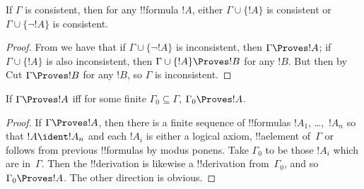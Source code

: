 \documentclass[../../include/open-logic-section]{subfiles}
\begin{document}
\begin{prop}
If $\Gamma$ is consistent, then for any !!{formula} $!A$, either
$\Gamma \cup\{!A\}$ is consistent or $\Gamma \cup\{\lnot !A\}$ is
consistent.
\end{prop}

\begin{proof}
From  we have that if $\Gamma \cup \{\lnot !A\}$ is
inconsistent, then $\Gamma \Proves !A$; if $\Gamma \cup \{ !A\}$ is
also inconsistent, then $\Gamma \cup \{!A\} \Proves !B$ for any
$!B$. But then by Cut $\Gamma \Proves !B$ for any $!B$, so $\Gamma$ is
inconsistent.
\end{proof}

\begin{prop}
If $\Gamma \Proves !A$ iff for some finite $\Gamma_0 \subseteq
\Gamma$, $\Gamma_0 \Proves !A$.
\end{prop}

\begin{proof}
If $\Gamma \Proves !A$, then there is a finite sequence of
!!{formula}s $!A_1$, \dots,~$!A_n$ so that $!A \ident !A_n$ and each
$!A_i$ is either a logical axiom, !!a{element} of~$\Gamma$ or follows
from previous !!{formula}s by modus ponens.  Take $\Gamma_0$ to be
those $!A_i$ which are in~$\Gamma$.  Then the !!{derivation} is
likewise a !!{derivation} from~$\Gamma_0$, and so $\Gamma_0 \Proves
!A$.  The other direction is obvious.
\end{proof}
\end{document}
